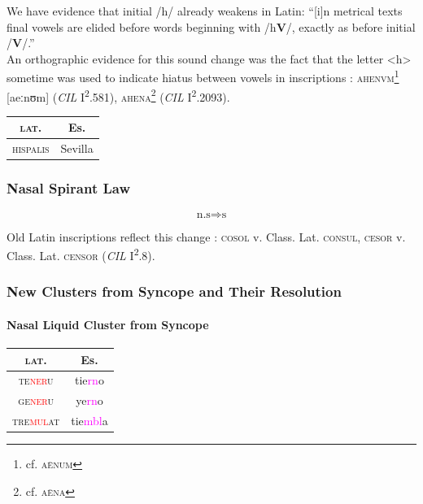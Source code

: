 \documentclass{report}[12pt]
\begin{document}
We have evidence that initial /h/ already weakens in Latin: ``[i]n metrical texts final vowels are elided before words beginning with /h\textbf{V}/, exactly as before initial /\textbf{V}/.'' \parencite[p.~87]{companion_to_latin} \\
An orthographic evidence for this sound change was the fact that the letter <h> sometime was used to indicate hiatus between vowels in inscriptions \parencite[p.~18]{companion_to_latin}: \textsc{ahenvm}\footnote{cf. \textsc{a\={e}num}} [aeːnʊm] (\emph{CIL} I\textsuperscript{2}.581), \textsc{ahena}\footnote{cf. \textsc{a\={e}na}} (\emph{CIL} I\textsuperscript{2}.2093).

\begin{tabular}{c c}
  \textsc{lat.} & Es. \\
  \hline
  \textsc{hispalis} & Sevilla
\end{tabular}

\subsubsection{Nasal Spirant Law}

\begin{tcolorbox}
  \[ \text{n.s} \Rightarrow \text{s} \]
\end{tcolorbox}

Old Latin inscriptions reflect this change \parencite[p.~17]{companion_to_latin}: \textsc{cosol} v. Class. Lat. \textsc{consul}, \textsc{cesor} v. Class. Lat. \textsc{censor} (\emph{CIL} I\textsuperscript{2}.8).

\subsubsection{New Clusters from Syncope and Their Resolution}

\paragraph*{Nasal Liquid Cluster from Syncope}

\begin{center}
  \begin{tabular}{c c}
    \textsc{lat.} & Es. \\
    \hline
    \textsc{te\textcolor{red}{ner}u} & tie\textcolor{magenta}{rn}o \\
    \textsc{ge\textcolor{red}{ner}u} & ye\textcolor{magenta}{rn}o \\
    \textsc{tre\textcolor{red}{mul}at} & tie\textcolor{magenta}{mbl}a \\
  \end{tabular}
\end{center}
\end{document}
